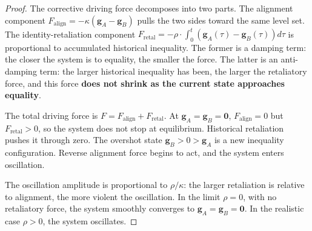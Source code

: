 \documentclass[12pt,a4paper]{article}
\theoremstyle{remark}
\begin{document}
\begin{proof}
The corrective driving force decomposes into two parts. The alignment component $F_{\text{align}} = -\kappa (\mathbf{g}_A - \mathbf{g}_B)$ pulls the two sides toward the same level set. The identity-retaliation component $F_{\text{retal}} = -\rho \cdot \int_0^t (\mathbf{g}_A(\tau) - \mathbf{g}_B(\tau)) d\tau$ is proportional to accumulated historical inequality. The former is a damping term: the closer the system is to equality, the smaller the force. The latter is an anti-damping term: the larger historical inequality has been, the larger the retaliatory force, and this force \textbf{does not shrink as the current state approaches equality}.

The total driving force is $F = F_{\text{align}} + F_{\text{retal}}$. At $\mathbf{g}_A = \mathbf{g}_B = \mathbf{0}$, $F_{\text{align}} = 0$ but $F_{\text{retal}} > 0$, so the system does not stop at equilibrium. Historical retaliation pushes it through zero. The overshot state $\mathbf{g}_B > 0 > \mathbf{g}_A$ is a new inequality configuration. Reverse alignment force begins to act, and the system enters oscillation.

The oscillation amplitude is proportional to $\rho/\kappa$: the larger retaliation is relative to alignment, the more violent the oscillation. In the limit $\rho = 0$, with no retaliatory force, the system smoothly converges to $\mathbf{g}_A = \mathbf{g}_B = \mathbf{0}$. In the realistic case $\rho > 0$, the system oscillates.
\end{proof}
\end{document}
